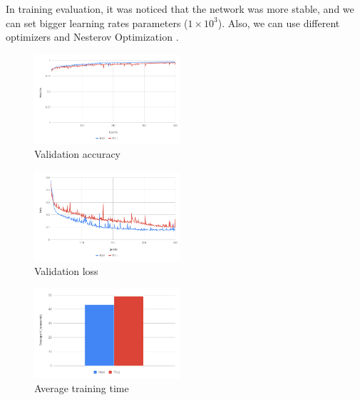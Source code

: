 In training evaluation, it was noticed that the network was more stable, and we can set bigger learning rates parameters ($1 \times 10^3$). Also, we can use different optimizers and Nesterov Optimization \cite{Nesterov:1983wy}.

\begin{figure}
  \centering
  \includegraphics[width=0.48\textwidth]{figures/val_acc.png}
  \caption{Validation accuracy}
  \label{fig:val_accuracy}
\end{figure}

\begin{figure}
  \centering
  \includegraphics[width=0.48\textwidth]{figures/val_loss.png}
  \caption{Validation loss}
  \label{fig:val_loss}
\end{figure}

\begin{figure}
  \centering
  \includegraphics[width=0.48\textwidth]{figures/train_time.png}
  \caption{Average training time}
  \label{fig:train_time}
\end{figure}

